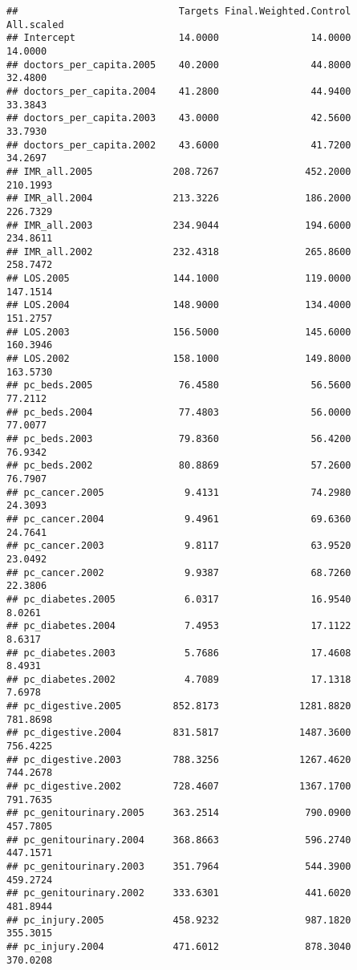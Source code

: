 \documentclass[
]{article}
\begin{document}
\begin{verbatim}
##                            Targets Final.Weighted.Control All.scaled
## Intercept                  14.0000                14.0000    14.0000
## doctors_per_capita.2005    40.2000                44.8000    32.4800
## doctors_per_capita.2004    41.2800                44.9400    33.3843
## doctors_per_capita.2003    43.0000                42.5600    33.7930
## doctors_per_capita.2002    43.6000                41.7200    34.2697
## IMR_all.2005              208.7267               452.2000   210.1993
## IMR_all.2004              213.3226               186.2000   226.7329
## IMR_all.2003              234.9044               194.6000   234.8611
## IMR_all.2002              232.4318               265.8600   258.7472
## LOS.2005                  144.1000               119.0000   147.1514
## LOS.2004                  148.9000               134.4000   151.2757
## LOS.2003                  156.5000               145.6000   160.3946
## LOS.2002                  158.1000               149.8000   163.5730
## pc_beds.2005               76.4580                56.5600    77.2112
## pc_beds.2004               77.4803                56.0000    77.0077
## pc_beds.2003               79.8360                56.4200    76.9342
## pc_beds.2002               80.8869                57.2600    76.7907
## pc_cancer.2005              9.4131                74.2980    24.3093
## pc_cancer.2004              9.4961                69.6360    24.7641
## pc_cancer.2003              9.8117                63.9520    23.0492
## pc_cancer.2002              9.9387                68.7260    22.3806
## pc_diabetes.2005            6.0317                16.9540     8.0261
## pc_diabetes.2004            7.4953                17.1122     8.6317
## pc_diabetes.2003            5.7686                17.4608     8.4931
## pc_diabetes.2002            4.7089                17.1318     7.6978
## pc_digestive.2005         852.8173              1281.8820   781.8698
## pc_digestive.2004         831.5817              1487.3600   756.4225
## pc_digestive.2003         788.3256              1267.4620   744.2678
## pc_digestive.2002         728.4607              1367.1700   791.7635
## pc_genitourinary.2005     363.2514               790.0900   457.7805
## pc_genitourinary.2004     368.8663               596.2740   447.1571
## pc_genitourinary.2003     351.7964               544.3900   459.2724
## pc_genitourinary.2002     333.6301               441.6020   481.8944
## pc_injury.2005            458.9232               987.1820   355.3015
## pc_injury.2004            471.6012               878.3040   370.0208

\end{verbatim}
\end{document}
